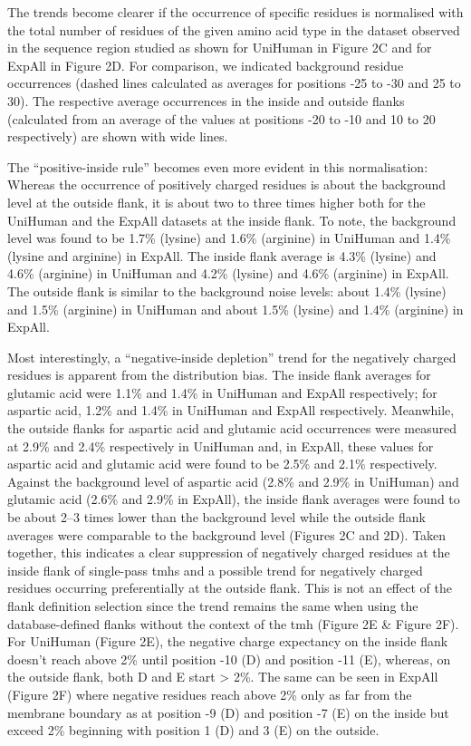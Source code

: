 The trends become clearer if the occurrence of specific residues is normalised with the total number of residues of the given amino acid type in the dataset observed in the sequence region studied as shown for UniHuman in Figure 2C and for ExpAll in Figure 2D. For comparison, we indicated background residue occurrences (dashed lines calculated as averages for positions -25 to -30 and 25 to 30). The respective average occurrences in the inside and outside flanks (calculated from an average of the values at positions -20 to -10 and 10 to 20 respectively) are shown with wide lines.

The “positive-inside rule” becomes even more evident in this normalisation: Whereas the occurrence of positively charged residues is about the background level at the outside flank, it is about two to three times higher both for the UniHuman and the ExpAll datasets at the inside flank. To note, the background level was found to be 1.7\% (lysine) and 1.6\% (arginine) in UniHuman and 1.4\% (lysine and arginine) in ExpAll. The inside flank average is 4.3\% (lysine) and 4.6\% (arginine) in UniHuman and 4.2\% (lysine) and 4.6\% (arginine) in ExpAll. The outside flank is similar to the background noise levels: about 1.4\% (lysine) and 1.5\% (arginine) in UniHuman and about 1.5\% (lysine) and 1.4\% (arginine) in ExpAll.

Most interestingly, a ``negative‑inside depletion'' trend for the negatively charged residues is apparent from the distribution bias. The inside flank averages for glutamic acid were 1.1\% and 1.4\% in UniHuman and ExpAll respectively; for aspartic acid, 1.2\% and 1.4\% in UniHuman and ExpAll respectively. Meanwhile, the outside flanks for aspartic acid and glutamic acid occurrences were measured at 2.9\% and 2.4\% respectively in UniHuman and, in ExpAll, these values for aspartic acid and glutamic acid were found to be 2.5\% and 2.1\% respectively. Against the background level of aspartic acid (2.8\% and 2.9\% in UniHuman) and glutamic acid (2.6\% and 2.9\% in ExpAll), the inside flank averages were found to be about 2--3 times lower than the background level while the outside flank averages were comparable to the background level (Figures 2C and 2D). Taken together, this indicates a clear suppression of negatively charged residues at the inside flank of single-pass \gls{tmh}s and a possible trend for negatively charged residues occurring preferentially at the outside flank. This is not an effect of the flank definition selection since the trend remains the same when using the database-defined flanks without the context of the \gls{tmh} (Figure 2E \& Figure 2F). For UniHuman (Figure 2E), the negative charge expectancy on the inside flank doesn’t reach above 2\% until position -10 (D) and position -11 (E), whereas, on the outside flank, both D and E start > 2\%. The same can be seen in ExpAll (Figure 2F) where negative residues reach above 2\% only as far from the membrane boundary as at position -9 (D) and position -7 (E) on the inside but exceed 2\% beginning with position 1 (D) and 3 (E) on the outside.

